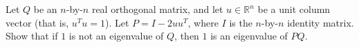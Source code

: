 Let $Q$ be an $n$-by-$n$ real orthogonal matrix, and let $u\in \mathbb{R}^n$ be a unit column vector (that is, $u^Tu=1$). Let $P=I-2uu^T$, where $I$ is the  $n$-by-$n$ identity matrix. Show that if $1$ is not an eigenvalue of $Q$, then $1$ is an eigenvalue of $PQ$.